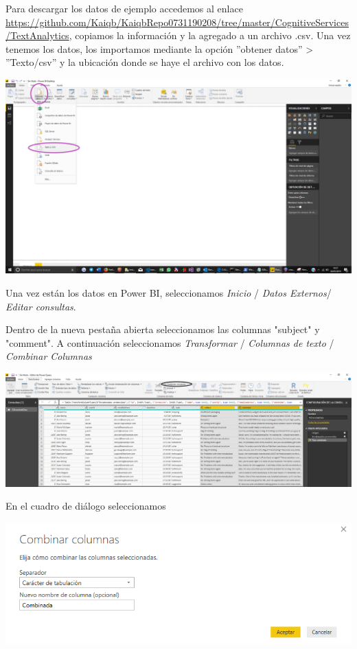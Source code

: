 \documentclass[english,runningheads,a4paper]{llncs}[2018/03/10]
\newenvironment{nscenter}
 {\parskip=0pt\par\nopagebreak\centering}
 {\par\noindent\ignorespacesafterend}
\begin{document}
    
    Para descargar los datos de ejemplo accedemos al enlace 
    \url{https://github.com/Kaiqb/KaiqbRepo0731190208/tree/master/CognitiveServices/TextAnalytics}, 
    copiamos la información y la agregado a un archivo .csv. Una vez tenemos 
    los datos, los importamos mediante la opción 
    ''obtener datos'' > ''Texto/csv'' y la ubicación donde se haye el archivo 
    con los datos.
    
    \begin{nscenter}  
        \includegraphics[scale=0.25]{./IA/AZURE/loadData.png}
    \end{nscenter}
    
    Una vez están los datos en Power BI, seleccionamos \textit{Inicio} / 
    \textit{Datos Externos}/ \textit{Editar consultas}.
    
    Dentro de la nueva pestaña abierta seleccionamos las columnas "subject" y 
    "comment". A continuación seleccionamos \textit{Transformar} / 
    \textit{Columnas de texto} / \textit{Combinar Columnas}
    
    \begin{nscenter}
        \includegraphics[scale=0.25]{./IA/AZURE/combinarColumnas.png}
    \end{nscenter}
    
    En el cuadro de diálogo seleccionamos 
    
    \begin{nscenter}
        \includegraphics[scale=0.25]{./IA/AZURE/comCol.png}
    \end{nscenter}
    
\end{document}
